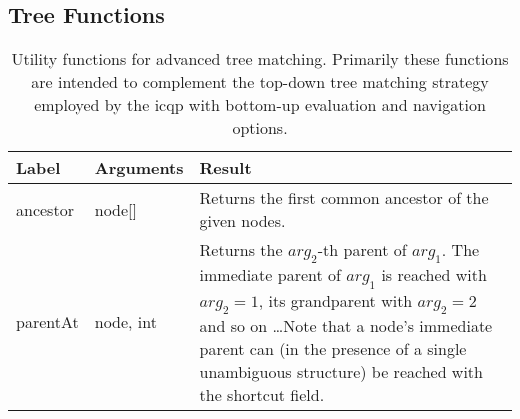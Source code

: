 \documentclass[11pt,a4paper]{article}
\begin{document}
\subsection{Tree Functions}
\label{sec:tree-functions}

\begin{table}[!htb]\centering
	\begin{tabular}{|p{}|p{}|p{}|}
		\hline 
		\textbf{Label} & \textbf{Arguments} & \textbf{Result} \\ 
		\hline 
		\hline  
		ancestor & node[] & Returns the first common ancestor of the given nodes. \\ 
		\hline  
		parentAt & node, int & Returns the $arg_2$-th parent of $arg_1$. The immediate parent of $arg_1$ is reached with $arg_2 = 1$, its grandparent with $arg_2 = 2$ and so on \dots Note that a node's immediate parent can (in the presence of a single unambiguous structure) be reached with the \query{parent} shortcut field. \\ 
		\hline 
	\end{tabular}
	\caption[Tree functions]{Utility functions for advanced tree matching. Primarily these functions are intended to complement the top-down tree matching strategy employed by the \ac{icqp} with bottom-up evaluation and navigation options.}
	\label{tab:tree-functions}
\end{table}
\end{document}

